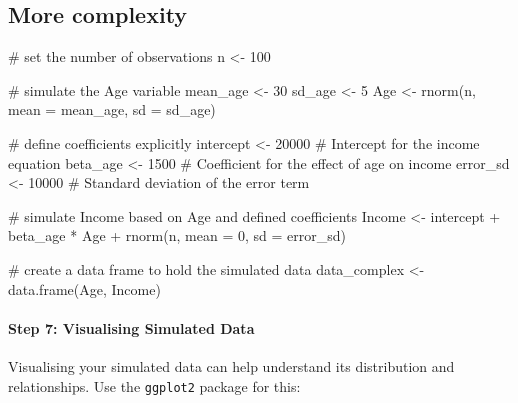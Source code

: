 \documentclass[
  singlecolumn]{article}
\let\oldparagraph\paragraph
\renewcommand{\paragraph}[1]{\oldparagraph{#1}\mbox{}}
\newenvironment{Shaded}{}{}
\newcommand{\AttributeTok}[1]{\textcolor[rgb]{0.84,0.23,0.29}{#1}}
\newcommand{\CommentTok}[1]{\textcolor[rgb]{0.42,0.45,0.49}{#1}}
\newcommand{\DecValTok}[1]{\textcolor[rgb]{0.00,0.36,0.77}{#1}}
\newcommand{\FunctionTok}[1]{\textcolor[rgb]{0.44,0.26,0.76}{#1}}
\newcommand{\NormalTok}[1]{\textcolor[rgb]{0.14,0.16,0.18}{#1}}
\newcommand{\OtherTok}[1]{\textcolor[rgb]{0.44,0.26,0.76}{#1}}
\newcommand{\SpecialCharTok}[1]{\textcolor[rgb]{0.00,0.36,0.77}{#1}}
\theoremstyle{definition}
\theoremstyle{remark}
\begin{document}
\subsection{More complexity}\label{more-complexity}

\begin{Shaded}
\begin{Highlighting}[]
\CommentTok{\# set the number of observations}
\NormalTok{n }\OtherTok{\textless{}{-}} \DecValTok{100}

\CommentTok{\# simulate the \textquotesingle{}Age\textquotesingle{} variable}
\NormalTok{mean\_age }\OtherTok{\textless{}{-}} \DecValTok{30}
\NormalTok{sd\_age }\OtherTok{\textless{}{-}} \DecValTok{5}
\NormalTok{Age }\OtherTok{\textless{}{-}} \FunctionTok{rnorm}\NormalTok{(n, }\AttributeTok{mean =}\NormalTok{ mean\_age, }\AttributeTok{sd =}\NormalTok{ sd\_age)}

\CommentTok{\# define coefficients explicitly}
\NormalTok{intercept }\OtherTok{\textless{}{-}} \DecValTok{20000}   \CommentTok{\# Intercept for the income equation}
\NormalTok{beta\_age }\OtherTok{\textless{}{-}} \DecValTok{1500}     \CommentTok{\# Coefficient for the effect of age on income}
\NormalTok{error\_sd }\OtherTok{\textless{}{-}} \DecValTok{10000}    \CommentTok{\# Standard deviation of the error term}

\CommentTok{\# simulate \textquotesingle{}Income\textquotesingle{} based on \textquotesingle{}Age\textquotesingle{} and defined coefficients}
\NormalTok{Income }\OtherTok{\textless{}{-}}\NormalTok{ intercept }\SpecialCharTok{+}\NormalTok{ beta\_age }\SpecialCharTok{*}\NormalTok{ Age }\SpecialCharTok{+} \FunctionTok{rnorm}\NormalTok{(n, }\AttributeTok{mean =} \DecValTok{0}\NormalTok{, }\AttributeTok{sd =}\NormalTok{ error\_sd)}

\CommentTok{\# create a data frame to hold the simulated data}
\NormalTok{data\_complex }\OtherTok{\textless{}{-}} \FunctionTok{data.frame}\NormalTok{(Age, Income)}
\end{Highlighting}
\end{Shaded}

\paragraph{Step 7: Visualising Simulated
Data}\label{step-7-visualising-simulated-data}

Visualising your simulated data can help understand its distribution and
relationships. Use the \texttt{ggplot2} package for this:
\end{document}
